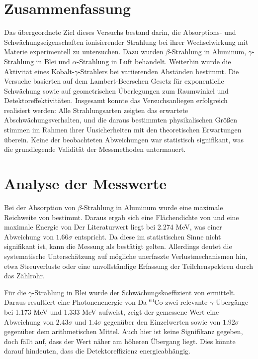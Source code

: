 \label{ch:Diskussion}

\section{Zusammenfassung}
\label{sec:Zusammenfassung}
Das übergeordnete Ziel dieses Versuchs bestand darin, die Absorptions- und Schwächungseigenschaften ionisierender Strahlung bei ihrer Wechselwirkung mit Materie experimentell zu untersuchen. Dazu wurden $\beta$-Strahlung in Aluminum, $\gamma$-Strahlung in Blei und $\alpha$-Strahlung in Luft behandelt. Weiterhin wurde die Aktivität eines Kobalt-$\gamma$-Strahlers bei variierenden Abständen bestimmt. Die Versuche basierten auf dem Lambert-Beerschen Gesetz für exponentielle Schwächung sowie auf geometrischen Überlegungen zum Raumwinkel und Detektoreffektivitäten. Insgesamt konnte das Versuchsanliegen erfolgreich realisiert werden: Alle Strahlungsarten zeigten das erwartete Abschwächungsverhalten, und die daraus bestimmten physikalischen Größen stimmen im Rahmen ihrer Unsicherheiten mit den theoretischen Erwartungen überein. Keine der beobachteten Abweichungen war statistisch signifikant, was die grundlegende Validität der Messmethoden untermauert.

\section{Analyse der Messwerte}
\label{sec:Analyse}
Bei der Absorption von $\beta$-Strahlung in Aluminum wurde eine maximale Reichweite von 
bestimmt. Daraus ergab sich eine Flächendichte von 
und eine maximale Energie von 
Der Literaturwert liegt bei 2.274 MeV, was einer Abweichung von $1.66\sigma$ entspricht. Da diese im statistischen Sinne nicht signifikant ist, kann die Messung als bestätigt gelten. Allerdings deutet die systematische Unterschätzung auf mögliche unerfaszte Verlustmechanismen hin, etwa Streuverluste oder eine unvollständige Erfassung der Teilchenspektren durch das Zählrohr.

Für die $\gamma$-Strahlung in Blei wurde der Schwächungskoeffizient von 
ermittelt. Daraus resultiert eine Photonenenergie von 
Da $^{60}\mathrm{Co}$ zwei relevante $\gamma$-Übergänge bei 1.173 MeV und 1.333 MeV aufweist, zeigt der gemessene Wert eine Abweichung von $2.43\sigma$ und $1.4\sigma$ gegenüber den Einzelwerten sowie von $1.92\sigma$ gegenüber dem arithmetischen Mittel. Auch hier ist keine Signifikanz gegeben, doch fällt auf, dass der Wert näher am höheren Übergang liegt. Dies könnte darauf hindeuten, dass die Detektoreffizienz energieabhängig.

